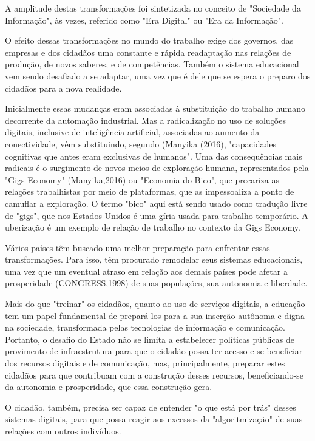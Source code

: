 A amplitude destas transformações foi sintetizada no conceito de "Sociedade da Informação", às vezes, referido como "Era Digital" ou "Era da Informação".

O efeito dessas transformações no mundo do trabalho exige dos governos, das empresas e dos cidadãos uma constante e rápida readaptação  nas relações de produção, de novos saberes, e de  competências. Também o sistema educacional vem sendo desafiado a se adaptar, uma vez que é dele que se espera o preparo dos cidadãos para a nova realidade.

Inicialmente essas mudanças eram associadas à substituição do trabalho humano decorrente da automação industrial. Mas a radicalização no uso de soluções digitais, inclusive de inteligência artificial, associadas ao aumento da conectividade, vêm substituindo, segundo (Manyika (2016), "capacidades cognitivas que antes eram exclusivas de humanos". Uma das consequências mais radicais é o surgimento de novos meios de exploração humana, representados pela "Gigs Economy" (Manyika,2016) ou "Economia do Bico", que precariza as relações trabalhistas por meio de plataformas, que as impessoaliza a ponto de camuflar a exploração. O termo "bico" aqui está sendo usado como tradução livre de "gigs", que nos Estados Unidos é uma gíria usada para trabalho temporário. A uberização é um exemplo de relação de trabalho no contexto da Gigs Economy.

Vários países têm buscado uma melhor preparação para enfrentar essas transformações. Para isso, têm procurado remodelar seus sistemas educacionais, uma vez que um eventual atraso em relação aos demais países pode afetar a prosperidade (CONGRESS,1998) de suas populações, sua autonomia e liberdade.

Mais do que "treinar" os cidadãos, quanto ao uso  de serviços digitais, a educação tem um papel fundamental de prepará-los para a sua inserção autônoma e digna na sociedade, transformada pelas tecnologias de informação e comunicação. Portanto, o desafio do Estado não se limita a estabelecer políticas públicas de provimento de infraestrutura para que o cidadão possa ter acesso e se beneficiar dos recursos digitais e de comunicação, mas, principalmente, preparar estes cidadãos para que contribuam com a construção desses recursos, beneficiando-se da autonomia e prosperidade, que  essa construção gera.

O cidadão, também, precisa ser capaz de entender "o que está por trás" desses sistemas digitais, para que possa reagir aos excessos da "algoritmização" de suas relações com outros indivíduos.


